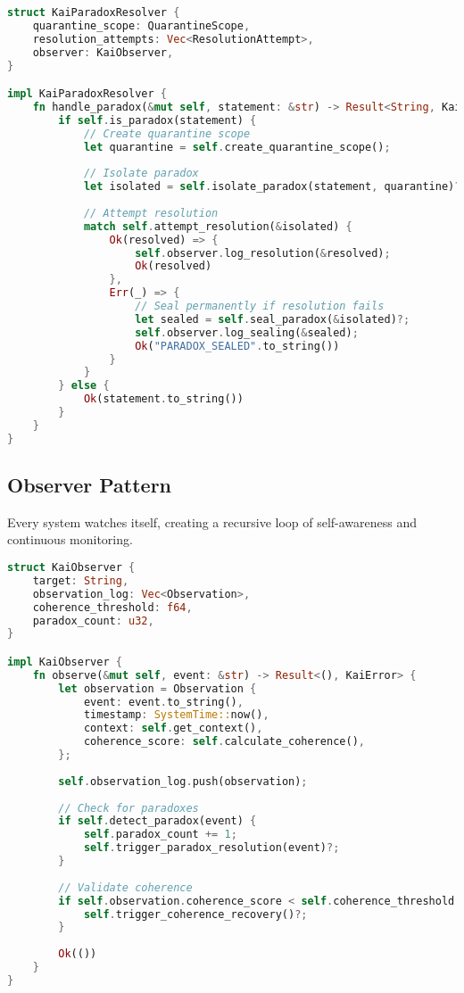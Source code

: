 \documentclass[11pt]{report}
\newcommand{\codebox}[2]{
  \begin{tcolorbox}[
    colback=gray!5,
    colframe=kai_blue,
    title=#1,
    fonttitle=\bfseries
  ]
  #2
  \end{tcolorbox}
}
\newcommand{\observerbox}[2]{
  \begin{tcolorbox}[
    colback=green!5,
    colframe=kai_green,
    title=#1,
    fonttitle=\bfseries
  ]
  #2
  \end{tcolorbox}
}
\begin{document}
\codebox{Paradox Detection and Resolution}{
\begin{lstlisting}[language=rust]
struct KaiParadoxResolver {
    quarantine_scope: QuarantineScope,
    resolution_attempts: Vec<ResolutionAttempt>,
    observer: KaiObserver,
}

impl KaiParadoxResolver {
    fn handle_paradox(&mut self, statement: &str) -> Result<String, KaiError> {
        if self.is_paradox(statement) {
            // Create quarantine scope
            let quarantine = self.create_quarantine_scope();
            
            // Isolate paradox
            let isolated = self.isolate_paradox(statement, quarantine)?;
            
            // Attempt resolution
            match self.attempt_resolution(&isolated) {
                Ok(resolved) => {
                    self.observer.log_resolution(&resolved);
                    Ok(resolved)
                },
                Err(_) => {
                    // Seal permanently if resolution fails
                    let sealed = self.seal_paradox(&isolated)?;
                    self.observer.log_sealing(&sealed);
                    Ok("PARADOX_SEALED".to_string())
                }
            }
        } else {
            Ok(statement.to_string())
        }
    }
}
\end{lstlisting}
}

\subsection{Observer Pattern}
\observerbox{Observer Pattern - Self-Monitoring}{
Every system watches itself, creating a recursive loop of self-awareness and continuous monitoring.
}

\codebox{Observer Implementation}{
\begin{lstlisting}[language=rust]
struct KaiObserver {
    target: String,
    observation_log: Vec<Observation>,
    coherence_threshold: f64,
    paradox_count: u32,
}

impl KaiObserver {
    fn observe(&mut self, event: &str) -> Result<(), KaiError> {
        let observation = Observation {
            event: event.to_string(),
            timestamp: SystemTime::now(),
            context: self.get_context(),
            coherence_score: self.calculate_coherence(),
        };
        
        self.observation_log.push(observation);
        
        // Check for paradoxes
        if self.detect_paradox(event) {
            self.paradox_count += 1;
            self.trigger_paradox_resolution(event)?;
        }
        
        // Validate coherence
        if self.observation.coherence_score < self.coherence_threshold {
            self.trigger_coherence_recovery()?;
        }
        
        Ok(())
    }
}
\end{lstlisting}
}
\end{document}
